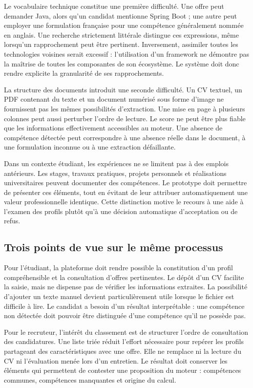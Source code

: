 Le vocabulaire technique constitue une première difficulté. Une offre peut demander Java, alors qu'un candidat mentionne Spring Boot ; une autre peut employer une formulation française pour une compétence généralement nommée en anglais. Une recherche strictement littérale distingue ces expressions, même lorsqu'un rapprochement peut être pertinent. Inversement, assimiler toutes les technologies voisines serait excessif : l'utilisation d'un framework ne démontre pas la maîtrise de toutes les composantes de son écosystème. Le système doit donc rendre explicite la granularité de ses rapprochements.

La structure des documents introduit une seconde difficulté. Un CV textuel, un PDF contenant du texte et un document numérisé sous forme d'image ne fournissent pas les mêmes possibilités d'extraction. Une mise en page à plusieurs colonnes peut aussi perturber l'ordre de lecture. Le score ne peut être plus fiable que les informations effectivement accessibles au moteur. Une absence de compétence détectée peut correspondre à une absence réelle dans le document, à une formulation inconnue ou à une extraction défaillante.

Dans un contexte étudiant, les expériences ne se limitent pas à des emplois antérieurs. Les stages, travaux pratiques, projets personnels et réalisations universitaires peuvent documenter des compétences. Le prototype doit permettre de présenter ces éléments, tout en évitant de leur attribuer automatiquement une valeur professionnelle identique. Cette distinction motive le recours à une aide à l'examen des profils plutôt qu'à une décision automatique d'acceptation ou de refus.

\subsection{Trois points de vue sur le même processus}

Pour l'étudiant, la plateforme doit rendre possible la constitution d'un profil compréhensible et la consultation d'offres pertinentes. Le dépôt d'un CV facilite la saisie, mais ne dispense pas de vérifier les informations extraites. La possibilité d'ajouter un texte manuel devient particulièrement utile lorsque le fichier est difficile à lire. Le candidat a besoin d'un résultat interprétable : une compétence non détectée doit pouvoir être distinguée d'une compétence qu'il ne possède pas.

Pour le recruteur, l'intérêt du classement est de structurer l'ordre de consultation des candidatures. Une liste triée réduit l'effort nécessaire pour repérer les profils partageant des caractéristiques avec une offre. Elle ne remplace ni la lecture du CV ni l'évaluation menée lors d'un entretien. Le résultat doit conserver les éléments qui permettent de contester une proposition du moteur : compétences communes, compétences manquantes et origine du calcul.

